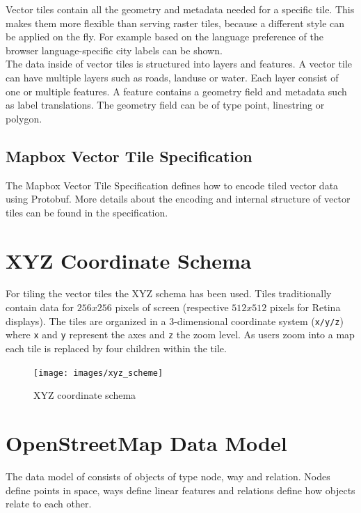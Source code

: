 Vector tiles contain all the geometry and metadata needed for a specific tile. This makes them more flexible than serving raster tiles, because a different style can be applied on the fly. For example based on the language preference of the browser language-specific city labels can be shown.\\
The data inside of vector tiles is structured into layers and features. A vector tile can have multiple layers such as roads, landuse or water. Each layer consist of one or multiple features. A feature contains a geometry field and metadata such as label translations. The geometry field can be of type point, linestring or polygon. 

\subsection{Mapbox Vector Tile Specification}\label{part1_vector_tile_specification}

The Mapbox Vector Tile Specification defines how to encode tiled vector data using Protobuf. More details about the encoding and internal structure of vector tiles can be found in the specification\cite{104_mapbox.com_2016}.

\section{XYZ Coordinate Schema}\label{part1_xyz_coordinates}

For tiling the vector tiles the XYZ schema has been used. Tiles traditionally contain data for $256 x 256$ pixels of screen (respective $512 x 512$ pixels for Retina displays).
The tiles are organized in a 3-dimensional coordinate system (\texttt{x/y/z}) where \texttt{x} and \texttt{y} represent the axes and \texttt{z} the zoom level. As users zoom into a map each tile is replaced by four children within the tile.

\begin{figure}[H]
\centering
\texttt{[image: images/xyz\_scheme]}
\caption{XYZ coordinate schema}
\end{figure}

\section{OpenStreetMap Data Model}\label{openstreetmap_data_model}

The data model of \osm{} consists of objects of type node, way and relation. Nodes define points in space, ways define linear features and relations define how objects relate to each other\cite{1_osm_wiki_2016}.

